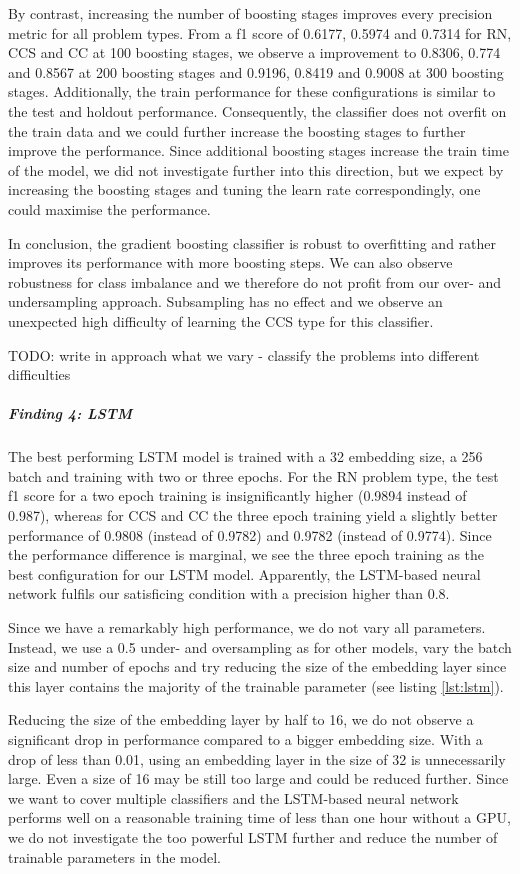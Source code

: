 By contrast, increasing the number of boosting stages improves every precision metric for all problem types. From a f1 score of 0.6177, 0.5974 and 0.7314 for RN, CCS and CC at 100 boosting stages, we observe a improvement to 0.8306, 0.774 and 0.8567 at 200 boosting stages and 0.9196, 0.8419 and 0.9008 at 300 boosting stages. Additionally, the train performance for these configurations is similar to the test and holdout performance. Consequently, the classifier does not overfit on the train data and we could further increase the boosting stages to further improve the performance. Since additional boosting stages increase the train time of the model, we did not investigate further into this direction, but we expect by increasing the boosting stages and tuning the learn rate correspondingly, one could maximise the performance. 

In conclusion, the gradient boosting classifier is robust to overfitting and rather improves its performance with more boosting steps. We can also observe robustness for class imbalance and we therefore do not profit from our over- and undersampling approach. Subsampling has no effect and we observe an unexpected high difficulty of learning the CCS type for this classifier.




TODO: write in approach what we vary
- classify the problems into different difficulties

\subparagraph{Finding 4: LSTM}
The best performing LSTM model is trained with a 32 embedding size, a 256 batch and training with two or three epochs. For the RN problem type, the test f1 score for a two epoch training is insignificantly higher (0.9894 instead of 0.987), whereas for CCS and CC the three epoch training yield a slightly better performance of 0.9808 (instead of 0.9782) and 0.9782 (instead of 0.9774). Since the performance difference is marginal, we see the three epoch training as the best configuration for our LSTM model. Apparently, the LSTM-based neural network fulfils our satisficing condition with a precision higher than 0.8.

Since we have a remarkably high performance, we do not vary all parameters. Instead, we use a 0.5 under- and oversampling as for other models, vary the batch size and number of epochs and try reducing the size of the embedding layer since this layer contains the majority of the trainable parameter (see listing \ref{lst:lstm}).

Reducing the size of the embedding layer by half to 16, we do not observe a significant drop in performance compared to a bigger embedding size. With a drop of less than 0.01, using an embedding layer in the size of 32 is unnecessarily large. Even a size of 16 may be still too large and could be reduced further. Since we want to cover multiple classifiers and the LSTM-based neural network performs well on a reasonable training time of less than one hour without a GPU, we do not investigate the too powerful LSTM further and reduce the number of trainable parameters in the model. 


